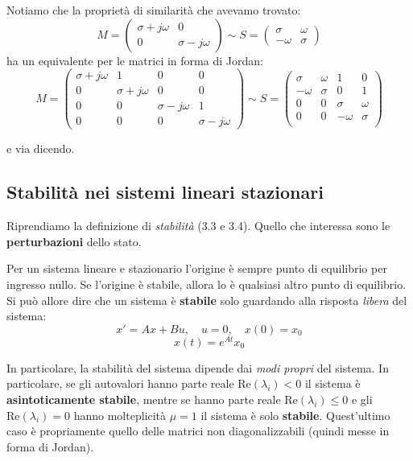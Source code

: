 \documentclass[a4paper,11pt]{article}
\begin{document}
\par\smallskip
Notiamo che la proprietà di similarità che avevamo trovato:
$$
M = \begin{pmatrix}
	\sigma + j\omega & 0 \\
	0 & \sigma - j\omega
\end{pmatrix}
\sim
S = \begin{pmatrix}
	\sigma & \omega \\
	-\omega & \sigma
\end{pmatrix}
$$
ha un equivalente per le matrici in forma di Jordan:
$$
M=
\begin{pmatrix}
	\sigma + j \omega & 1 & 0 & 0 \\
	0 & \sigma + j \omega & 0 & 0 \\
	0 & 0 & \sigma - j \omega & 1 \\
	0 & 0 & 0 & \sigma - j \omega
\end{pmatrix}
\sim 
S=
\begin{pmatrix}
	\sigma & \omega & 1 & 0 \\
	-\omega & \sigma & 0 & 1 \\
	0 & 0 & \sigma & \omega \\
	0 & 0 & -\omega & \sigma \\
\end{pmatrix}
$$

e via dicendo.

\subsection{Stabilità nei sistemi lineari stazionari}
Riprendiamo la definizione di \textit{stabilità} (3.3 e 3.4).
Quello che interessa sono le \textbf{perturbazioni} dello stato.

Per un sistema lineare e stazionario l'origine è sempre punto di equilibrio per ingresso nullo.
Se l'origine è stabile, allora lo è qualsiasi altro punto di equilibrio.
Si può allore dire che un sistema è \textbf{stabile} solo guardando alla risposta \textit{libera} del sistema:
$$
x' = Ax + Bu, \quad u = 0, \quad x(0) = x_0
$$
$$
x(t) = e^{At}x_0
$$

In particolare, la stabilità del sistema dipende dai \textit{modi propri} del sistema.
In particolare, se gli autovalori hanno parte reale $\mathrm{Re}(\lambda_i) < 0$ il sistema è \textbf{asintoticamente stabile}, mentre se hanno parte reale $\mathrm{Re}(\lambda_i) \leq 0$ e gli $\mathrm{Re}(\lambda_i) = 0$ hanno molteplicità $\mu =1$ il sistema è solo \textbf{stabile}.
Quest'ultimo caso è propriamente quello delle matrici non diagonalizzabili (quindi messe in forma di Jordan).
\end{document}
